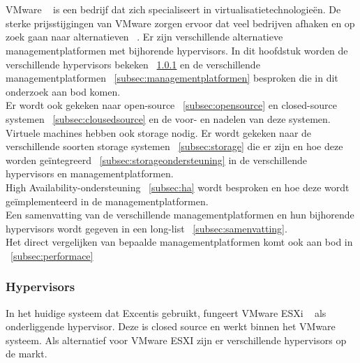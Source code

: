 
\chapter{}%
\label{ch:stand-van-zaken}


VMware ~\autocite{vmware} is een bedrijf dat zich specialiseert in virtualisatietechnologieën. De sterke prijsstijgingen van VMware zorgen ervoor dat veel bedrijven afhaken en op zoek gaan naar alternatieven ~\autocite{Hale2024}.
Er zijn verschillende alternatieve managementplatformen met bijhorende hypervisors.
In dit hoofdstuk worden de verschillende hypervisors bekeken  ~\ref{subsec:Hypervisors} en de verschillende managementplatformen ~\ref{subsec:managementplatformen} besproken die in dit onderzoek aan bod komen. \\
Er wordt ook gekeken naar open-source ~\ref{subsec:opensource} en closed-source systemen  ~\ref{subsec:clousedsource} en de voor- en nadelen van deze systemen. \\
Virtuele machines hebben ook  storage nodig. Er wordt gekeken naar de verschillende soorten storage systemen ~\ref{subsec:storage} die er zijn en hoe deze worden geïntegreerd  ~\ref{subsec:storageondersteuning} in de verschillende hypervisors en managementplatformen. \\
High Availability-ondersteuning ~\ref{subsec:ha} wordt besproken en hoe deze wordt geïmplementeerd in de managementplatformen. \\
Een samenvatting van de verschillende managementplatformen en hun bijhorende hypervisors wordt gegeven in een long-list  ~\ref{subsec:samenvatting}. \\
Het direct vergelijken van bepaalde managementplatformen komt ook aan bod in ~\ref{subsec:performace}
\subsection{Hypervisors}\label{subsec:Hypervisors}
In het huidige systeem dat Excentis gebruikt, fungeert VMware ESXi ~\autocite{vmware} als onderliggende hypervisor. Deze is closed source en werkt binnen het VMware systeem. Als alternatief voor VMware ESXI zijn er verschillende hypervisors op de markt.

